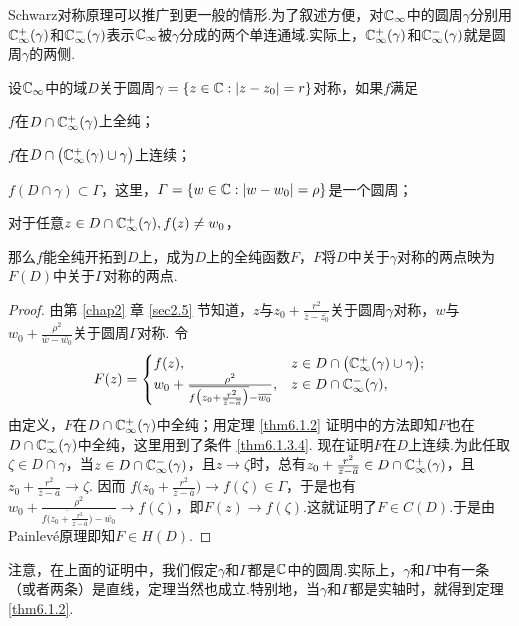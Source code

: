 Schwarz对称原理可以推广到更一般的情形.为了叙述方便，对$\mathbb C_\infty$中的圆周$\gamma$分别用$\mathbb C_\infty^+(\gamma)$和$\mathbb C_\infty^-(\gamma)$表示$\mathbb C_\infty$被$\gamma$分成的两个单连通域.实际上，$\mathbb C_\infty^+(\gamma)$和$\mathbb C_\infty^-(\gamma)$就是圆周$\gamma$的两侧.
\begin{theorem}\label{thm6.1.3}
  设$\mathbb C_\infty$中的域$D$关于圆周$\gamma=\{z\in\mathbb C:|z-z_0|=r\}$对称，如果$f$满足
  \begin{eenum}
    \item \label{thm6.1.3.1}$f$在$D\cap\mathbb C_\infty^+(\gamma)$上全纯；
    \item \label{thm6.1.3.2}$f$在$D\cap\big(\mathbb C_\infty^+(\gamma)\cup\gamma\big)$上连续；
    \item \label{thm6.1.3.3}$f(D\cap\gamma)\subset\Gamma$，这里，$\varGamma=\{w\in\mathbb C:|w-w_0|=\rho\}$是一个圆周；
    \item \label{thm6.1.3.4}对于任意$z\in D\cap\mathbb C_\infty^+(\gamma),f(z)\ne w_0$，
  \end{eenum}
  那么$f$能全纯开拓到$D$上，成为$D$上的全纯函数$F$，$F$将$D$中关于$\gamma$对称的两点映为$F(D)$中关于$\Gamma$对称的两点.
\end{theorem}
\begin{proof}
  由第 \ref{chap2} 章 \ref{sec2.5} 节知道，$z$与$z_0+\frac{r^2}{\bar z-\bar {z_0}}$关于圆周$\gamma$对称，$w$与$w_0+\frac{\rho^2}{\bar w-\bar {w_0}}$关于圆周$\Gamma$对称. 令
  \[
    F(z) = \begin{cases}
    f(z), & z\in D \cap\big(\mathbb C_\infty^+(\gamma)\cup\gamma\big);\\
    w_0 + \frac{\rho^2}{{}\mkern1mu\overline{\mkern-1muf\big(z_0+\frac{r^2}{{}\mkern1mu\overline{\mkern-1muz}-{}\mkern1mu\overline{\mkern-1mua}}\big)}-{}\mkern1mu\overline{\mkern-1muw_0}}, & z\in D\cap
    \mathbb C_\infty^-(\gamma),
  \end{cases}
  \]
  由定义，$F$在$D\cap\mathbb C_\infty^+(\gamma)$中全纯；用定理 \ref{thm6.1.2} 证明中的方法即知$F$也在$D\cap\mathbb C_\infty^-(\gamma)$中全纯，这里用到了条件 \ref{thm6.1.3.4}. 现在证明$F$在$D$上连续.为此任取$\zeta\in D\cap\gamma$，当$z\in D\cap\mathbb C_\infty^-(\gamma)$，且$z\to\zeta$时，总有$z_0+\frac{r^2}{{}\mkern1mu\overline{\mkern-1muz}-{}\mkern1mu\overline{\mkern-1mua}}\in D\cap\mathbb C_\infty^+(\gamma)$，且$z_0+\frac{r^2}{\bar z-\bar a}\to\zeta$. 因而 $f\bigg(z_0+\frac{r^2}{\bar z-\bar a}\bigg)\to f(\zeta)\in\Gamma$，于是也有$  w_0+\frac{\rho^2}{\bar{f\big(z_0+\frac{r^2}{\bar z-\bar a}\big)}-\bar {w_0}}\to f(\zeta)$，即$F(z)\to f(\zeta)$.这就证明了$F\in C(D)$.于是由Painlev\'e原理即知$F\in H(D)$.
\end{proof}

注意，在上面的证明中，我们假定$\gamma$和$\Gamma$都是$\mathbb C$中的圆周.实际上，$\gamma$和$\Gamma$中有一条（或者两条）是直线，定理当然也成立.特别地，当$\gamma$和$\Gamma$都是实轴时，就得到定理 \ref{thm6.1.2}.

